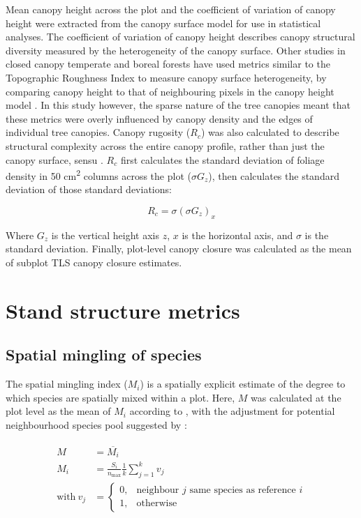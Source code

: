 \documentclass[11pt,a4paper]{article}
\begin{document}
Mean canopy height across the plot and the coefficient of variation of canopy height were extracted from the canopy surface model for use in statistical analyses. The coefficient of variation of canopy height describes canopy structural diversity measured by the heterogeneity of the canopy surface. Other studies in closed canopy temperate and boreal forests have used metrics similar to the Topographic Roughness Index to measure canopy surface heterogeneity, by comparing canopy height to that of neighbouring pixels in the canopy height model \citep{Weligepolage2012,HerreroHuerta2020}. In this study however, the sparse nature of the tree canopies meant that these metrics were overly influenced by canopy density and the edges of individual tree canopies. Canopy rugosity ($R_{c}$) was also calculated to describe structural complexity across the entire canopy profile, rather than just the canopy surface, sensu \citet{Hardiman2011}. $R_{c}$ first calculates the standard deviation of foliage density in 50 cm\textsuperscript{2} columns across the plot ($\sigma{}G_{z}$), then calculates the standard deviation of those standard deviations: 

\begin{equation}
	R_{c} = \sigma{}(\sigma{}G_{z})_{x}
\end{equation}

Where $G_{z}$ is the vertical height axis $z$, $x$ is the horizontal axis, and $\sigma{}$ is the standard deviation. Finally, plot-level canopy closure was calculated as the mean of subplot TLS canopy closure estimates. 

\section{Stand structure metrics}

\subsection{Spatial mingling of species}

The spatial mingling index ($M_{i}$) is a spatially explicit estimate of the degree to which species are spatially mixed within a plot. Here, $M$ was calculated at the plot level as the mean of $M_{i}$ according to \citet{Gadow2002}, with the adjustment for potential neighbourhood species pool suggested by \citet{Hui2011}: 

\begin{align}
\begin{split}
	M &= \overline{M_{i}} \\
	M_{i} &= \frac{S_{i}}{n_{\text{max}}} \frac{1}{k} \sum_{j=1}^{k} v_{j} \\
	\text{with}\ v_{j} &= \begin{cases}
		0,& \text{neighbour $j$ same species as reference $i$} \\
		1,& \text{otherwise}
	\end{cases} \\
\end{split}
\end{align}
\end{document}
